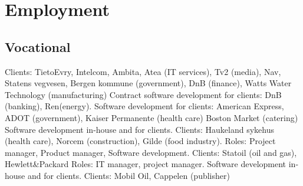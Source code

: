 \documentclass[11pt,a4paper,sans]{moderncv} %
\begin{document}
\pagebreak

\section{Employment}
\subsection{Vocational}
{\newline{}}
{Clients: TietoEvry, Intelcom, Ambita, Atea (IT services), Tv2 (media), Nav, Statens vegvesen, Bergen kommune (government), DnB (finance), Watts Water Technology (manufacturing) }
{\newline{}}
{Contract software development for clients: DnB (banking), Ren(energy).}
{\newline{}}
{Software development for clients: American Express, ADOT (government), Kaiser Permanente (health care) Boston Market (catering)}
{\newline{}}
{Software development in-house and for clients. Clients: Haukeland sykehus (health care), Norcem (construction), Gilde (food industry).}
{\newline{}}
{Roles: Project manager, Product manager, Software development. Clients: Statoil (oil and gas), Hewlett\&Packard}
{\newline{}}
{Roles: IT manager, project manager.}
{\newline{}}
{Software development in-house and for clients. Clients: Mobil Oil, Cappelen (publisher)}
\end{document}
